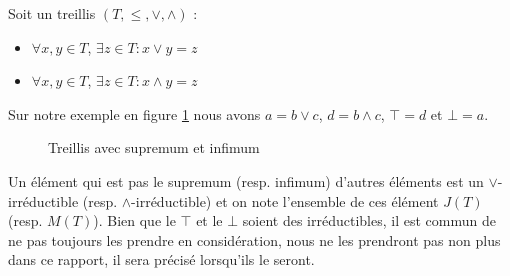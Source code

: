 \begin{definition}[Treillis]
Soit un treillis $(T, \leq, \vee, \wedge)$ :
\begin{itemize}
	\item $\forall x, y \in T$, $\exists z \in T : x \vee y = z$
	\item $\forall x, y \in T$, $\exists z \in T : x \wedge y = z$
\end{itemize}
\end{definition}

Sur notre exemple en figure \ref{treillis_sup_inf} nous avons $a = b \vee c$, $d = b \wedge c$, $\top = d$ et $\bot = a$.

\begin{figure}[H]
	\begin{minipage}{0.5\textwidth}
	\begin{center}
	\end{center}
	\end{minipage}
	\begin{minipage}{0.5\textwidth}
	\begin{center}
	\end{center}
	\end{minipage}
	\caption{Treillis avec supremum et infimum}
	\label{treillis_sup_inf}
\end{figure}

Un élément qui est pas le supremum (resp. infimum) d'autres éléments est un $\vee$-irréductible (resp. $\wedge$-irréductible) et on note l'ensemble de ces élément $J(T)$ (resp. $M(T)$). Bien que le $\top$ et le $\bot$ soient des irréductibles, il est commun de ne pas toujours les prendre en considération, nous ne les prendront pas non plus dans ce rapport, il sera précisé lorsqu'ils le seront.

